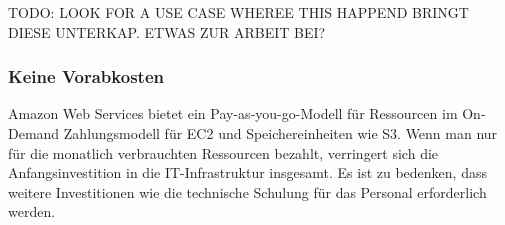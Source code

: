 TODO: LOOK FOR A USE CASE WHEREE THIS HAPPEND
BRINGT DIESE UNTERKAP. ETWAS ZUR ARBEIT BEI?


\subsubsection{Keine Vorabkosten}
Amazon Web Services bietet ein Pay-as-you-go-Modell für Ressourcen im On-Demand
Zahlungsmodell für EC2 und Speichereinheiten wie S3.
Wenn man nur für die monatlich verbrauchten Ressourcen bezahlt, verringert sich die Anfangsinvestition in die IT-Infrastruktur insgesamt. Es ist zu bedenken, dass weitere Investitionen wie die technische Schulung für das Personal erforderlich werden.



\begin{comment}
Advantages of Cloud Technology
As the technology has matured over the last decade, companies are moving to the
cloud to lower costs, reduce complexity, and increase flexibility. The cloud
provides scalable and powerful compute solutions, low-cost, reliable storage, and addition, cloud technologies can be used to deploy solutions quickly and cost effectively around the world and on any device.
When you decouple from the data center, you’ll be able to:
x Decrease your TCO: Eliminate many of the costs related to building and
maintaining a data center or colocation deployment. Pay for only the
resources you consume.

x Reduce complexity: Reduce the need to manage infrastructure,
investigate licensing issues, or divert resources.
x Adjust capacity on the fly: Add or reduce resources, depending on
seasonal business needs, using infrastructure that is secure, reliable, and
broadly accessible.
x Reduce time to market: Design and develop new IT projects faster.
x Deploy quickly, even worldwide: Deploy applications across multiple
geographic areas.
x Increase efficiencies: Use automation to reduce or eliminate IT
management activities that waste time and resources.
x Innovate more: Spin up a new server and try out an idea. Each project
moves through the funnel more quickly because the cloud makes it faster
(and cheaper) to deploy, test, and launch new products and services.
x Spend your resources strategically: Switch to a DevOps model to free
your IT staff from operations and maintenance that can be handled by the
cloud services provider.
x Enhance security: Spend less time conducting security reviews on
infrastructure. Mature cloud providers have teams of people who focus on
security, offering best practices to ensure you’re compliant, no matter what
your industry.
\end{comment}

